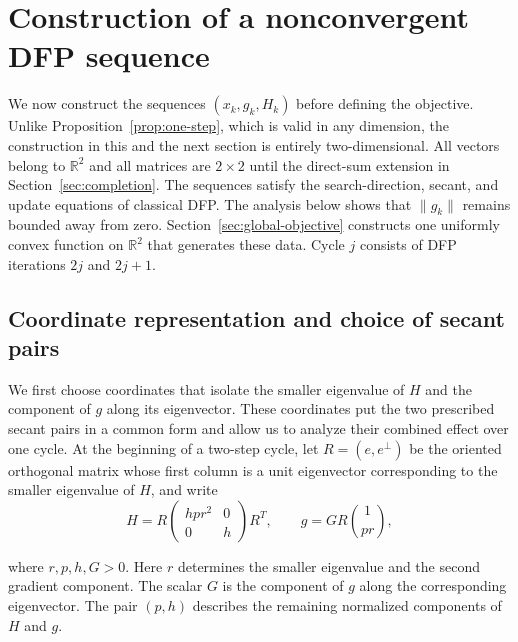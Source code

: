 \documentclass[11pt]{article}
\newcommand{\R}{\mathbb R}
\begin{document}
\section{Construction of a nonconvergent DFP sequence}
\label{sec:alternating-sequence}

We now construct the sequences $(x_k,g_k,H_k)$ before defining the objective.
Unlike Proposition~\ref{prop:one-step}, which is valid in any dimension, the
construction in this and the next section is entirely two-dimensional.  All
vectors belong to $\R^2$ and all matrices are $2\times2$ until the direct-sum
extension in Section~\ref{sec:completion}.  The sequences satisfy the
search-direction, secant, and update equations of classical DFP.  The analysis
below shows that $\|g_k\|$ remains bounded away from zero.
Section~\ref{sec:global-objective} constructs one uniformly convex function on
$\R^2$ that generates these data.  Cycle $j$ consists of DFP iterations
$2j$ and $2j+1$.

\subsection{Coordinate representation and choice of secant pairs}

We first choose coordinates that isolate the smaller eigenvalue of $H$ and
the component of $g$ along its eigenvector.  These coordinates put the two
prescribed secant pairs in a common form and allow us to analyze their
combined effect over one cycle.  At the beginning of a two-step cycle, let
$R=(e,e^\perp)$ be the oriented
orthogonal matrix whose first column is a unit eigenvector corresponding to
the smaller eigenvalue of $H$, and write
\begin{equation}\label{eq:coordinate-representation}
H=R\begin{pmatrix}hpr^2&0\\0&h\end{pmatrix}R^T,
\qquad
g=GR\binom{1}{pr},
\end{equation}


where $r,p,h,G>0$.  Here $r$ determines the smaller eigenvalue and the second
gradient component.  The scalar $G$ is the component of $g$ along the
corresponding eigenvector.  The pair $(p,h)$ describes the remaining normalized
components of $H$ and $g$.
\end{document}
